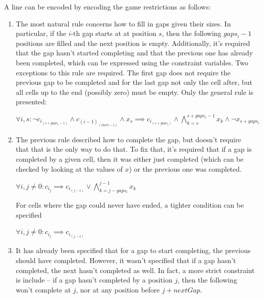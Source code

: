 \documentclass[12pt]{article}
\begin{document}
A line can be encoded by encoding the game restrictions as follows:
\begin{enumerate}
  \item The most natural rule concerns how to fill in gaps given their sizes.
        In particular, if the $i$-th gap starts at at position $s$, then the following $gaps_i - 1$ positions are filled and the next position is empty.
        Additionally, it's required that the gap hasn't started completing and that the previous one has already been completed, which can be expressed using the constraint variables.
        Two exceptions to this rule are required.
        The first gap does not require the previous gap to be completed and for the last gap not only the cell after, but all cells up to the end (possibly zero) must be empty.
        Only the general rule is presented:
        \begin{center}
          $\forall i, s: \neg c_{i}_{(s+gaps_i-1)} \wedge c_{(i-1)}_{(start-1)} \wedge x_s \implies c_{i}_{(s+gaps_i)} \wedge \bigwedge_{k=s}^{s+gaps_i-1} x_k \wedge \neg x_{s+gaps_i}$
        \end{center}


    \item The previous rule described how to complete the gap, but doesn't require that that is the only way to do that.
          To fix that, it's required that if a gap is completed by a given cell, then it was either just completed (which can be checked by looking at the values of $x$) or the previous one was completed.
          \begin{center}
            $\forall i, j \ne 0: c_{i}_{j} \implies c_{i}_{(j-1)} \vee \bigwedge_{k=j-gaps_i}^{j-1} x_k$
          \end{center}

          For cells where the gap could never have ended, a tighter condition can be specified
          \begin{center}
            $\forall i, j \ne 0: c_{i}_{j} \implies c_{i}_{(j-1)}$
          \end{center}

  \item It has already been specified that for a gap to start completing, the previous should have completed. However, it wasn't specified that if a gap hasn't completed, the next hasn't completed as well. In fact, a more strict constraint is include -- if a gap hasn't completed by a position $j$, then the following won't complete at $j$, nor at any position before $j+nextGap$.


\end{enumerate}
\end{document}
